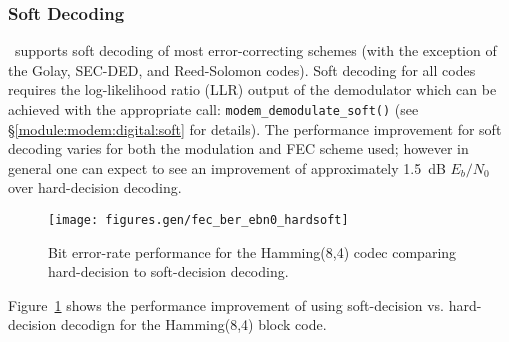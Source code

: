 \subsubsection{Soft Decoding}
\label{module:fec:soft}
\liquid\ supports soft decoding of most error-correcting schemes
(with the exception of the Golay, SEC-DED, and Reed-Solomon codes).
Soft decoding for all codes requires the log-likelihood ratio (LLR)
output of the demodulator which can be achieved with the appropriate
call: {\tt modem\_demodulate\_soft()}
(see \S\ref{module:modem:digital:soft} for details).
The performance improvement for soft decoding varies for both the
modulation and FEC scheme used;
however in general one can expect to see an improvement of approximately
1.5~dB $E_b/N_0$ over hard-decision decoding.
%
\begin{figure}[h]
\centering
  \texttt{[image: figures.gen/fec\_ber\_ebn0\_hardsoft]}
  \label{fig:fec:block_ber:esn0}
\caption{Bit error-rate performance for the Hamming(8,4) codec comparing
         hard-decision to soft-decision decoding.}
\label{fig:fec:hardsoft_ber}
\end{figure}
%
Figure~\ref{fig:fec:hardsoft_ber} shows the performance improvement of
using soft-decision vs. hard-decision decodign for the Hamming(8,4)
block code.

